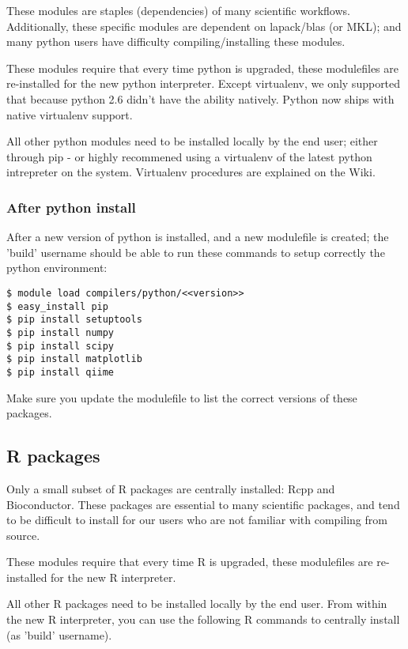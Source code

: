\documentclass{article}
\begin{document}
These modules are staples (dependencies) of many scientific workflows.  
Additionally, these specific modules are dependent on lapack/blas (or MKL); and 
many python users have difficulty compiling/installing these modules.

These modules require that every time python is upgraded, these modulefiles are 
re-installed for the new python interpreter.  Except virtualenv, we only 
supported that because python 2.6 didn't have the ability natively.  Python now 
ships with native virtualenv support.

All other python modules need to be installed locally by the end user; either 
through pip - or highly recommened using a virtualenv of the latest python 
intrepreter on the system.  Virtualenv procedures are explained on the Wiki.

\subsubsection{After python install}

After a new version of python is installed, and a new modulefile is created; 
the 'build' username should be able to run these commands to setup correctly 
the python environment:

\begin{verbatim}
$ module load compilers/python/<<version>>
$ easy_install pip
$ pip install setuptools
$ pip install numpy
$ pip install scipy
$ pip install matplotlib
$ pip install qiime
\end{verbatim}

Make sure you update the modulefile to list the correct versions of these 
packages.

\subsection{R packages}

Only a small subset of R packages are centrally installed: Rcpp and 
Bioconductor.  These packages are essential to many scientific packages, and 
tend to be difficult to install for our users who are not familiar with 
compiling from source.  

These modules require that every time R is upgraded, these modulefiles are 
re-installed for the new R interpreter.

All other R packages need to be installed locally by the end user.  From within 
the new R interpreter, you can use the following R commands to centrally 
install (as 'build' username).
\end{document}

